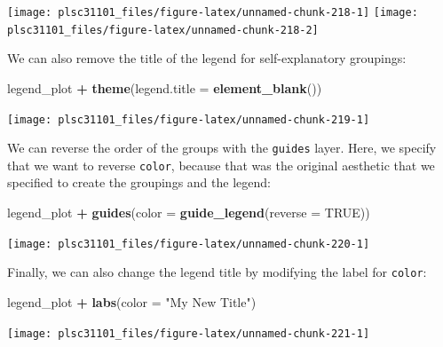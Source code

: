 \documentclass[
]{book}
\newenvironment{Shaded}{\begin{snugshade}}{\end{snugshade}}
\newcommand{\DataTypeTok}[1]{\textcolor[rgb]{0.13,0.29,0.53}{#1}}
\newcommand{\KeywordTok}[1]{\textcolor[rgb]{0.13,0.29,0.53}{\textbf{#1}}}
\newcommand{\NormalTok}[1]{#1}
\newcommand{\OperatorTok}[1]{\textcolor[rgb]{0.81,0.36,0.00}{\textbf{#1}}}
\newcommand{\OtherTok}[1]{\textcolor[rgb]{0.56,0.35,0.01}{#1}}
\newcommand{\StringTok}[1]{\textcolor[rgb]{0.31,0.60,0.02}{#1}}
\begin{document}
\begin{center}\texttt{[image: plsc31101\_files/figure-latex/unnamed-chunk-218-1]} \texttt{[image: plsc31101\_files/figure-latex/unnamed-chunk-218-2]} \end{center}

We can also remove the title of the legend for self-explanatory groupings:

\begin{Shaded}
\begin{Highlighting}[]
\NormalTok{legend_plot }\OperatorTok{+}\StringTok{ }
\StringTok{  }\KeywordTok{theme}\NormalTok{(}\DataTypeTok{legend.title =} \KeywordTok{element_blank}\NormalTok{())}
\end{Highlighting}
\end{Shaded}

\begin{center}\texttt{[image: plsc31101\_files/figure-latex/unnamed-chunk-219-1]} \end{center}

We can reverse the order of the groups with the \texttt{guides} layer. Here, we specify that we want to reverse \texttt{color}, because that was the original aesthetic that we specified to create the groupings and the legend:

\begin{Shaded}
\begin{Highlighting}[]
\NormalTok{legend_plot }\OperatorTok{+}
\StringTok{  }\KeywordTok{guides}\NormalTok{(}\DataTypeTok{color =} \KeywordTok{guide_legend}\NormalTok{(}\DataTypeTok{reverse =} \OtherTok{TRUE}\NormalTok{))}
\end{Highlighting}
\end{Shaded}

\begin{center}\texttt{[image: plsc31101\_files/figure-latex/unnamed-chunk-220-1]} \end{center}

Finally, we can also change the legend title by modifying the label for \texttt{color}:

\begin{Shaded}
\begin{Highlighting}[]
\NormalTok{legend_plot }\OperatorTok{+}
\StringTok{  }\KeywordTok{labs}\NormalTok{(}\DataTypeTok{color =} \StringTok{"My New Title"}\NormalTok{)}
\end{Highlighting}
\end{Shaded}

\begin{center}\texttt{[image: plsc31101\_files/figure-latex/unnamed-chunk-221-1]} \end{center}
\end{document}
